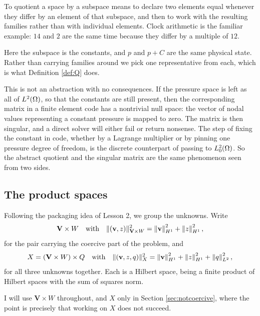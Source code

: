 \documentclass[11pt,a4paper]{article}
\newcommand{\Vsp}{\mathbf{V}}
\newcommand{\Qsp}{Q}
\newcommand{\Wsp}{W}
\newcommand{\Xsp}{X}
\begin{document}
\begin{remark}
\label{rem:quotient}
To quotient a space by a subspace means to declare two elements equal whenever
they differ by an element of that subspace, and then to work with the resulting
families rather than with individual elements. Clock arithmetic is the familiar
example: $14$ and $2$ are the same time because they differ by a multiple of
$12$.

Here the subspace is the constants, and $p$ and $p + C$ are the same physical
state. Rather than carrying families around we pick one representative from each,
which is what Definition \ref{def:Q} does.

This is not an abstraction with no consequences. If the pressure space is left
as all of $L^{2}(\Omega)$, so that the constants are still present, then the
corresponding matrix in a finite element code has a nontrivial null space: the
vector of nodal values representing a constant pressure is mapped to zero. The
matrix is then singular, and a direct solver will either fail or return
nonsense. The step of fixing the constant in code, whether by a Lagrange
multiplier or by pinning one pressure degree of freedom, is the discrete
counterpart of passing to $L^{2}_{0}(\Omega)$. So the abstract quotient and the singular
matrix are the same phenomenon seen from two sides.
\end{remark}

\subsection{The product spaces}

Following the packaging idea of Lesson 2, we group the unknowns. Write
\[
  \Vsp \times \Wsp
  \quad \text{with} \quad
  \lVert (\bv, z) \rVert_{\Vsp \times \Wsp}^{2} = \normH{\bv}^{2} + \normH{z}^{2} ,
\]
for the pair carrying the coercive part of the problem, and
\[
  \Xsp = (\Vsp \times \Wsp) \times \Qsp
  \quad \text{with} \quad
  \lVert (\bv, z, q) \rVert_{\Xsp}^{2}
  = \normH{\bv}^{2} + \normH{z}^{2} + \normL{q}^{2} ,
\]
for all three unknowns together. Each is a Hilbert space, being a finite product
of Hilbert spaces with the sum of squares norm.

I will use $\Vsp \times \Wsp$ throughout, and $\Xsp$ only in Section
\ref{sec:notcoercive}, where the point is precisely that working on $\Xsp$ does
not succeed.

\end{document}
